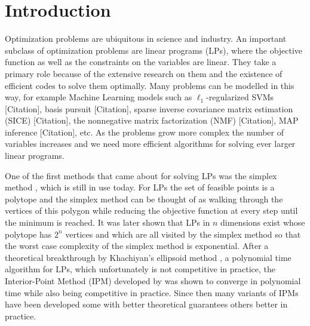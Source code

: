 \chapter{Introduction} \label{chap:introduction}

Optimization problems are ubiquitous in science and industry.
An important subclass of optimization problems are linear programs (LPs), where the objective function as well as the constraints on the variables are linear.
They take a primary role because of the extensive research on them and the existence of efficient codes to solve them optimally.
Many problems can be modelled in this way, for example Machine Learning models such as \(\ell_1\)-regularized SVMs [Citation], basis pursuit [Citation], sparse inverse covariance matrix estimation (SICE) [Citation], the nonnegative matrix factorization (NMF) [Citation], MAP inference [Citation], etc. %
As the problems grow more complex the number of variables increases and we need more efficient algorithms for solving ever larger linear programs.

One of the first methods that came about for solving LPs was the simplex method \cite{Dantzig-Simplex}, which is still in use today.
For LPs the set of feasible points is a polytope and the simplex method can be thought of as walking through the vertices of this polygon while reducing the objective function at every step until the minimum is reached.
It was later shown that LPs in \(n\) dimensions exist whose polytope has \(2^n\) vertices and which are all visited by the simplex method so that the worst case complexity of the simplex method is exponential.
After a theoretical breakthrough by Khachiyan's ellipsoid method \cite{Khachiyan-Ellipsoid1,Khachiyan-Ellipsoid2}, a polynomial time algorithm for LPs, which unfortunately is not competitive in practice, the Interior-Point Method (IPM) developed by \textcite{Karmarkar-IPM} was shown to converge in polynomial time while also being competitive in practice.
Since then many variants of IPMs have been developed some with better theoretical guarantees others better in practice.

